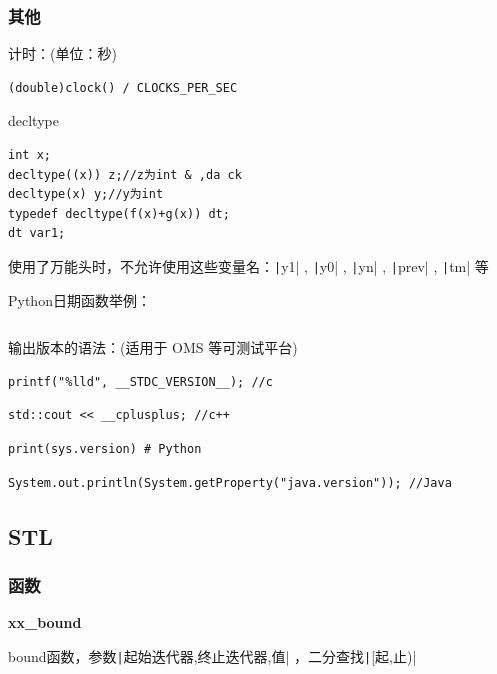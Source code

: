 \documentclass[twocolumn,10pt]{ctexart}
\makeatletter
\newcommand{\hfive}[1]{\par\addvspace{6pt}\@afterindentfalse
  {\noindent\bfseries\normalsize #1}\par\nobreak\vspace{2pt}}
\makeatother
\begin{document}
\subsubsection{其他}

计时：(单位：秒)

\begin{verbatim}
(double)clock() / CLOCKS_PER_SEC
\end{verbatim}

decltype

\begin{verbatim}
int x;
decltype((x)) z;//z为int & ,da ck
decltype(x) y;//y为int
typedef decltype(f(x)+g(x)) dt;
dt var1;
\end{verbatim}

使用了万能头时，不允许使用这些变量名：\texttt|y1| , \texttt|y0| , \texttt|yn| , \texttt|prev| , \texttt|tm| 等

Python日期函数举例：

\inputminted{python}{code/python_datetime.py}

输出版本的语法：(适用于 OMS 等可测试平台)

\begin{verbatim}
printf("%lld", __STDC_VERSION__); //c
\end{verbatim}

\begin{verbatim}
std::cout << __cplusplus; //c++
\end{verbatim}

\begin{verbatim}
print(sys.version) # Python
\end{verbatim}

\begin{verbatim}
System.out.println(System.getProperty("java.version")); //Java
\end{verbatim}

\subsection{STL}

\subsubsection{函数}

\hfive{xx\_bound}

bound函数，参数\texttt|起始迭代器,终止迭代器,值| ，二分查找\texttt|[起,止)|
\end{document}
